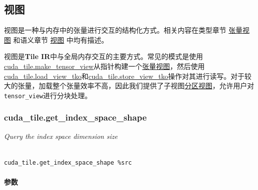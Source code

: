 \documentclass{article}
\begin{document}
\subsection{视图}


视图是一种与内存中的张量进行交互的结构化方式。相关内容在类型章节 \href{https://docs.nvidia.com/cuda/tile-ir/latest/sections/types.html#sub-sec-view-types}{张量视图} 和语义章节 \href{https://docs.nvidia.com/cuda/tile-ir/latest/sections/semantics.html#section-semantics-sub-section-views}{视图} 中均有描述。



视图是\textbf{Tile IR}中与全局内存交互的主要方式。常见的模式是使用\href{https://docs.nvidia.com/cuda/tile-ir/latest/sections/operations.html#op-cuda-tile-make-tensor-view}{cuda\_tile.make\_tensor\_view}从指针构建一个\href{https://docs.nvidia.com/cuda/tile-ir/latest/sections/types.html#type-tensor-view}{张量视图}，然后使用\href{https://docs.nvidia.com/cuda/tile-ir/latest/sections/operations.html#op-cuda-tile-load-view-tko}{cuda\_tile.load\_view\_tko}和\href{https://docs.nvidia.com/cuda/tile-ir/latest/sections/operations.html#op-cuda-tile-store-view-tko}{cuda\_tile.store\_view\_tko}操作对其进行读写。对于较大的张量，加载整个张量效率不高，因此我们提供了子视图\href{https://docs.nvidia.com/cuda/tile-ir/latest/sections/types.html#type-partition-view}{分区视图}，允许用户对\texttt{tensor\_view}进行分块处理。



\subsubsection{cuda\_tile.get\_index\_space\_shape}


\textit{Query the index space dimension size}




\begin{lstlisting}

cuda_tile.get_index_space_shape %src

\end{lstlisting}



\paragraph{参数}
\end{document}

